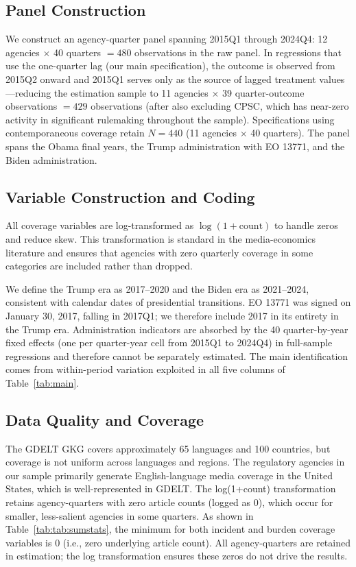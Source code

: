 \documentclass[12pt]{article}
\begin{document}
\subsection{Panel Construction}

We construct an agency-quarter panel spanning 2015Q1 through 2024Q4: 12 agencies $\times$ 40 quarters $= 480$ observations in the raw panel. In regressions that use the one-quarter lag (our main specification), the outcome is observed from 2015Q2 onward and 2015Q1 serves only as the source of lagged treatment values---reducing the estimation sample to 11 agencies $\times$ 39 quarter-outcome observations $= 429$ observations (after also excluding CPSC, which has near-zero activity in significant rulemaking throughout the sample). Specifications using contemporaneous coverage retain $N = 440$ (11 agencies $\times$ 40 quarters). The panel spans the Obama final years, the Trump administration with EO 13771, and the Biden administration.

\subsection{Variable Construction and Coding}

All coverage variables are log-transformed as $\log(1 + \text{count})$ to handle zeros and reduce skew. This transformation is standard in the media-economics literature \citep{tetlock2007giving} and ensures that agencies with zero quarterly coverage in some categories are included rather than dropped.

We define the Trump era as 2017--2020 and the Biden era as 2021--2024, consistent with calendar dates of presidential transitions. EO 13771 was signed on January 30, 2017, falling in 2017Q1; we therefore include 2017 in its entirety in the Trump era. Administration indicators are absorbed by the 40 quarter-by-year fixed effects (one per quarter-year cell from 2015Q1 to 2024Q4) in full-sample regressions and therefore cannot be separately estimated. The main identification comes from within-period variation exploited in all five columns of Table~\ref{tab:main}.

\subsection{Data Quality and Coverage}

The GDELT GKG covers approximately 65 languages and 100 countries, but coverage is not uniform across languages and regions. The regulatory agencies in our sample primarily generate English-language media coverage in the United States, which is well-represented in GDELT. The log(1+count) transformation retains agency-quarters with zero article counts (logged as 0), which occur for smaller, less-salient agencies in some quarters. As shown in Table~\ref{tab:tab:sumstats}, the minimum for both incident and burden coverage variables is 0 (i.e., zero underlying article count). All agency-quarters are retained in estimation; the log transformation ensures these zeros do not drive the results.
\end{document}
